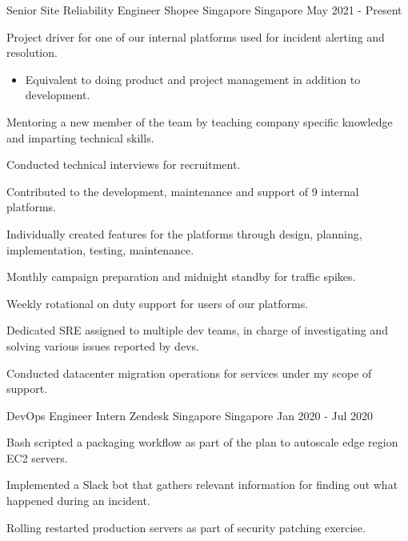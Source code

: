 

\begin{cventries}

  \cventry
    {Senior Site Reliability Engineer} %
    {Shopee Singapore} %
    {Singapore} %
    {May 2021 - Present} %
    {
      \begin{cvitems} %
        \item {Project driver for one of our internal platforms used for incident alerting and resolution.}
        \begin{itemize}
          \item{Equivalent to doing product and project management in addition to development.}
        \end{itemize}
        \item {Mentoring a new member of the team by teaching company specific knowledge and imparting technical skills.}
        \item {Conducted technical interviews for recruitment.}
        \item {Contributed to the development, maintenance and support of 9 internal platforms.}
        \item {Individually created features for the platforms through design, planning, implementation, testing, maintenance.}
        \item {Monthly campaign preparation and midnight standby for traffic spikes.}
        \item {Weekly rotational on duty support for users of our platforms.}
        \item {Dedicated SRE assigned to multiple dev teams, in charge of investigating and solving various issues reported by devs.}
        \item {Conducted datacenter migration operations for services under my scope of support.}
      \end{cvitems}
    }

  \cventry
    {DevOps Engineer Intern} %
    {Zendesk Singapore} %
    {Singapore} %
    {Jan 2020 - Jul 2020} %
    {
      \begin{cvitems} %
        \item {Bash scripted a packaging workflow as part of the plan to autoscale edge region EC2 servers.}
        \item {Implemented a Slack bot that gathers relevant information for finding out what happened during an incident.}
        \item {Rolling restarted production servers as part of security patching exercise.}
      \end{cvitems}
    }


\end{cventries}
